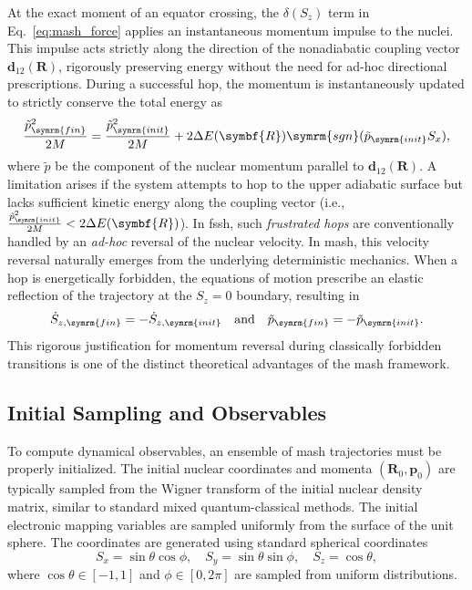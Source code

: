 At the exact moment of an equator crossing, the $\delta(S_z)$ term in Eq.~\eqref{eq:mash_force} applies an instantaneous momentum impulse to the nuclei. This impulse acts strictly along the direction of the nonadiabatic coupling vector $\symbf{d}_{12}(\symbf{R})$, rigorously preserving energy without the need for ad-hoc directional prescriptions. During a successful hop, the momentum is instantaneously updated to strictly conserve the total energy as
\begin{equation}
\frac{\tilde{p}_{\symrm{fin}}^2}{2M}=\frac{\tilde{p}_{\symrm{init}}^2}{2M}+2\Delta E(\symbf{R})\symrm{sgn}(\tilde{p}_{\symrm{init}}S_x),
\end{equation}
where $\tilde{p}$ be the component of the nuclear momentum parallel to $\symbf{d}_{12}(\symbf{R})$. A limitation arises if the system attempts to hop to the upper adiabatic surface but lacks sufficient kinetic energy along the coupling vector (i.e., $\frac{\tilde{p}_{\symrm{init}}^2}{2M}<2\Delta E(\symbf{R})$). In \acrshort{fssh}, such \textit{frustrated hops} are conventionally handled by an \textit{ad-hoc} reversal of the nuclear velocity. In \acrshort{mash}, this velocity reversal naturally emerges from the underlying deterministic mechanics. When a hop is energetically forbidden, the equations of motion prescribe an elastic reflection of the trajectory at the $S_z=0$ boundary, resulting in
\begin{equation}
\dot{S}_{z,\symrm{fin}}=-\dot{S}_{z,\symrm{init}}\quad\text{and}\quad\tilde{p}_{\symrm{fin}}=-\tilde{p}_{\symrm{init}}.
\end{equation}
This rigorous justification for momentum reversal during classically forbidden transitions is one of the distinct theoretical advantages of the \acrshort{mash} framework.
\subsection{Initial Sampling and Observables}
To compute dynamical observables, an ensemble of \acrshort{mash} trajectories must be properly initialized. The initial nuclear coordinates and momenta $(\symbf{R}_0,\symbf{p}_0)$ are typically sampled from the Wigner transform of the initial nuclear density matrix, similar to standard mixed quantum-classical methods.  The initial electronic mapping variables are sampled uniformly from the surface of the unit sphere. The coordinates are generated using standard spherical coordinates
\begin{equation}
S_x=\sin\theta\cos\phi,\quad S_y=\sin\theta\sin\phi,\quad S_z=\cos\theta,
\end{equation}
where $\cos\theta\in[-1, 1]$ and $\phi\in[0,2\pi]$ are sampled from uniform distributions. 

